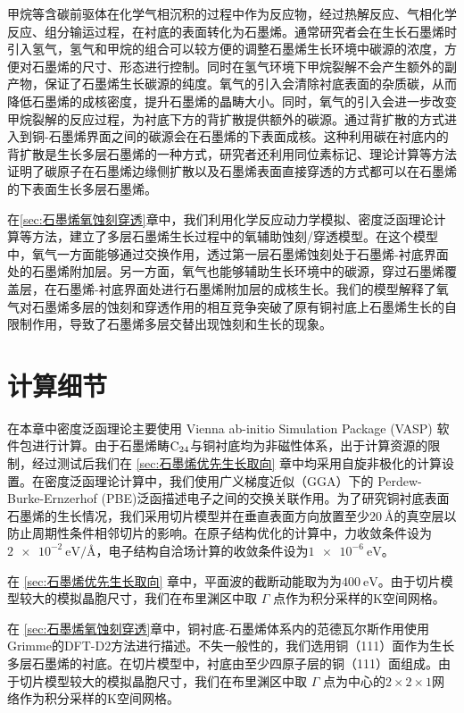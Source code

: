 甲烷等含碳前驱体在化学气相沉积的过程中作为反应物，经过热解反应、气相化学反应、组分输运过程，在衬底的表面转化为石墨烯。通常研究者会在生长石墨烯时引入氢气，氢气和甲烷的组合可以较方便的调整石墨烯生长环境中碳源的浓度，方便对石墨烯的尺寸、形态进行控制。同时在氢气环境下甲烷裂解不会产生额外的副产物，保证了石墨烯生长碳源的纯度。氧气的引入会清除衬底表面的杂质碳，从而降低石墨烯的成核密度，提升石墨烯的晶畴大小。同时，氧气的引入会进一步改变甲烷裂解的反应过程，为衬底下方的背扩散提供额外的碳源。通过背扩散的方式进入到铜-石墨烯界面之间的碳源会在石墨烯的下表面成核。这种利用碳在衬底内的背扩散是生长多层石墨烯的一种方式，研究者还利用同位素标记、理论计算等方法证明了碳原子在石墨烯边缘侧扩散以及石墨烯表面直接穿透的方式都可以在石墨烯的下表面生长多层石墨烯。

在\ref{sec:石墨烯氧蚀刻穿透}章中，我们利用化学反应动力学模拟、密度泛函理论计算等方法，建立了多层石墨烯生长过程中的氧辅助蚀刻/穿透模型。在这个模型中，氧气一方面能够通过交换作用，透过第一层石墨烯蚀刻处于石墨烯-衬底界面处的石墨烯附加层。另一方面，氧气也能够辅助生长环境中的碳源，穿过石墨烯覆盖层，在石墨烯-衬底界面处进行石墨烯附加层的成核生长。我们的模型解释了氧气对石墨烯多层的蚀刻和穿透作用的相互竞争突破了原有铜衬底上石墨烯生长的自限制作用，导致了石墨烯多层交替出现蚀刻和生长的现象。

\section{计算细节}
在本章中密度泛函理论主要使用 Vienna ab-initio Simulation Package (VASP) 软件包进行计算。由于石墨烯畴$\rm{C_{24}}$与铜衬底均为非磁性体系，出于计算资源的限制，经过测试后我们在 \ref{sec:石墨烯优先生长取向} 章中均采用自旋非极化的计算设置。在密度泛函理论计算中，我们使用广义梯度近似（GGA）下的 Perdew-Burke-Ernzerhof (PBE)泛函描述电子之间的交换关联作用。为了研究铜衬底表面石墨烯的生长情况，我们采用切片模型并在垂直表面方向放置至少$\SI{20}{\angstrom}$的真空层以防止周期性条件相邻切片的影响。在原子结构优化的计算中，力收敛条件设为$\SI{2e-2}{\electronvolt \per \angstrom}$，电子结构自洽场计算的收敛条件设为$\SI{1e-6}{\electronvolt}$。

在 \ref{sec:石墨烯优先生长取向} 章中，平面波的截断动能取为为$\SI{400}{\electronvolt}$。由于切片模型较大的模拟晶胞尺寸，我们在布里渊区中取 $\Gamma$ 点作为积分采样的K空间网格。

在 \ref{sec:石墨烯氧蚀刻穿透}章中，铜衬底-石墨烯体系内的范德瓦尔斯作用使用Grimme的DFT-D2方法进行描述。不失一般性的，我们选用铜（111）面作为生长多层石墨烯的衬底。在切片模型中，衬底由至少四原子层的铜（111）面组成。由于切片模型较大的模拟晶胞尺寸，我们在布里渊区中取 $\Gamma$ 点为中心的$2\times 2\times 1$网络作为积分采样的K空间网格。

